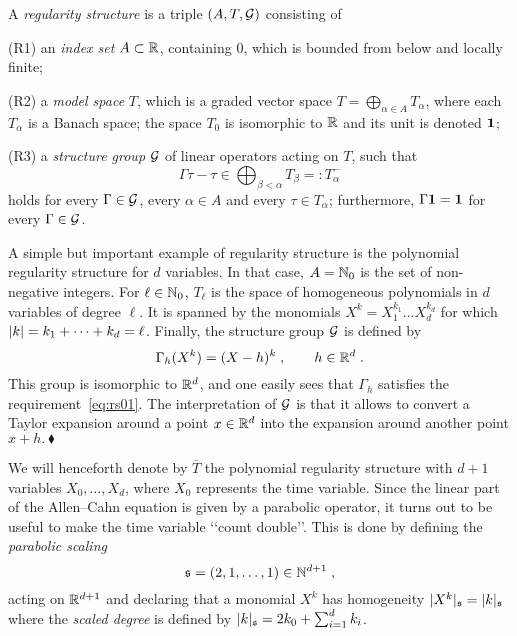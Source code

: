\documentclass[reqno,11pt]{article}
\def\unit{\vone}
\def\fraks{\mathfrak{s}}
\def\abss#1{\abs{#1}_\mathfrak{s}}
\def\Tbar{\overline T}
\begin{document}
\begin{definition}
\label{def:regularity_structure}
A \emph{regularity structure} is a triple $(A,T,{\mathcal G})$ consisting of 
\begin{enumH}
\item[(R1)] an \emph{index set} $A\subset\mathbb{R}$, containing $0$, which is bounded
from
below and locally finite;
\item[(R2)] a \emph{model space} $T$, which is a graded vector space 
$T=\bigoplus_{\alpha\in A}T_\alpha$, where each $T_\alpha$ is a Banach space;
the
space $T_0$ is isomorphic to $\mathbb{R}$ and its unit is denoted $\unit$;
\item[(R3)] a \emph{structure group} ${\mathcal G}$ of linear operators
acting on $T$, such
that 
\begin{equation}
 \label{eq:rs01}
 \Gamma\tau - \tau \in \bigoplus_{\beta<\alpha} T_\beta =: T_\alpha^- 
\end{equation} 
holds for every $\Gamma\in {\mathcal G}$, every $\alpha\in A$ and every $\tau\in
T_\alpha$;
furthermore, $\Gamma\unit = \unit$ for every $\Gamma\in {\mathcal G}$. 
\end{enumH}
\end{definition}

\begin{example}
\label{ex:rs_poly}
A simple but important example of regularity structure is the polynomial
regularity structure for $d$ variables. In that case, $A=\mathbb{N}_0$ is the set of
non-negative integers. For $\ell\in \mathbb{N}_0$, $T_\ell$ is the space of homogeneous
polynomials in $d$ variables of degree $\ell$. It is spanned by the monomials
$X^k = X_1^{k_1}\dots X_d^{k_d}$ for which $\lvert k\rvert = k_1+\dots+k_d = \ell$. 
Finally, the structure group ${\mathcal G}$ is defined by 
\begin{equation}
 \label{eq:rs02}
 \Gamma_h(X^k) = (X-h)^k\;, 
 \qquad h\in\R^d\;.
\end{equation}   
This group is isomorphic to $\mathbb{R}^d$, and one easily sees that $\Gamma_h$
satisfies the requirement~\eqref{eq:rs01}. The interpretation of ${\mathcal G}$ is that
it allows to convert a Taylor expansion around a point $x\in\mathbb{R}^d$ into the
expansion around another point $x+h.~\blacklozenge$ 
\end{example}

We will henceforth denote by $\Tbar$ the polynomial regularity structure with
$d+1$ variables $X_0,\dots,X_d$, where $X_0$ represents the time variable. Since
the linear part of the Allen--Cahn equation is given by a parabolic operator, it
turns out to be useful to make the time variable \lq\lq count double\rq\rq. This
is done by defining the \emph{parabolic scaling}
\begin{equation}
 \label{eq:rs03}
 \fraks = (2,1,\dots,1) \in \N^{d+1}\;,
\end{equation} 
acting on $\mathbb{R}^{d+1}$ and declaring that a monomial $X^k$ has homogeneity
$\abss{X^k} = \abss{k}$ where the \emph{scaled degree} is defined by
$\abss{k} = 2k_0 + \sum_{i=1}^dk_i$. 
\end{document}
